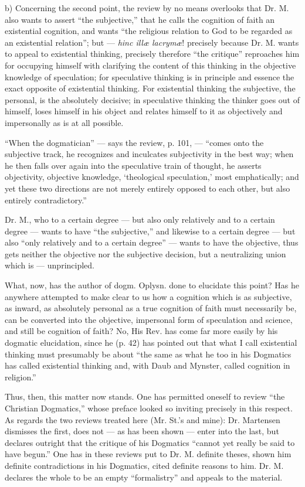 \documentclass[12pt,a4paper,openany]{book}
\newcommand{\opage}[1]{\marginnote{\footnotesize\textit{[#1]}}}
\begin{document}
b) Concerning the second point, the review by no means overlooks
that Dr. M. also wants to assert ``the subjective,''
that he calls the cognition of faith an existential cognition, and
wants ``the religious relation to God to be regarded as an existential relation'';
but --- \textit{hinc illæ lacrymæ}! precisely because Dr. M.
wants to appeal to existential thinking, precisely therefore
``the critique'' reproaches him for occupying himself with clarifying
the content of this thinking in the objective knowledge of speculation;
for speculative thinking is in principle and essence the exact
opposite of existential thinking. For existential thinking
the subjective, the personal, is the absolutely decisive; in
speculative thinking the thinker goes out of himself,
\setcounter{footnote}{0}%
\opage{62}loses himself in his object and relates himself to it as objectively
and impersonally as is at all possible.

``When the dogmatician'' --- says the review, p. 101, ---
``comes onto the subjective track, he recognizes and inculcates
subjectivity in the best way; when he then
falls over again into the speculative train of thought, he asserts
objectivity, objective knowledge, `theological speculation,'
most emphatically; and yet these two directions are
not merely entirely opposed to each other, but also entirely
contradictory.''

Dr. M., who to a certain degree --- but also only relatively
and to a certain degree --- wants to have ``the subjective,'' and
likewise to a certain degree --- but also ``only relatively and
to a certain degree'' --- wants to have the objective, thus gets neither
the objective nor the subjective decision, but a neutralizing
union which is --- unprincipled.

What, now, has the author of dogm. Oplysn. done to
elucidate this point? Has he anywhere attempted to make clear
to us how a cognition which is as subjective,
as inward, as absolutely personal as a true cognition of faith
must necessarily be, can be converted into the objective,
impersonal form of speculation and science, and still
be cognition of faith? No, His Rev. has come far
more easily by his dogmatic elucidation, since he (p. 42)
has pointed out that what I call existential
thinking must presumably be about ``the same as what he too in
his Dogmatics has called existential thinking and,
with Daub and Mynster, called cognition in religion.''

Thus, then, this matter now stands. One has permitted oneself
to review ``the Christian Dogmatics,'' whose preface
\setcounter{footnote}{0}%
\opage{63}looked so inviting precisely in this respect. As regards the
two reviews treated here (Mr. St.'s and mine):
Dr. Martensen dismisses the first, does not --- as has been
shown --- enter into the last, but declares outright
that the critique of his Dogmatics ``cannot yet really be
said to have begun.'' One has in these reviews put to
Dr. M. definite theses, shown him definite contradictions
in his Dogmatics, cited definite reasons to him. Dr. M.
declares the whole to be an empty ``formalistry'' and appeals
to the material.
\end{document}
